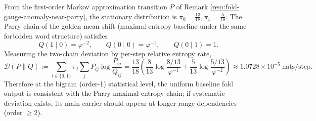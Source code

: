 \begin{remark}\label{rem:fold-gauge-anomaly-parry-kl}
From the first-order Markov approximation transition \(P\) of Remark \ref{rem:fold-gauge-anomaly-near-parry}, the stationary distribution is \(\pi_0=\frac{13}{18},\pi_1=\frac{5}{18}\).
The Parry chain of the golden mean shift (maximal entropy baseline under the same forbidden word structure) satisfies
\[
Q(1\mid 0)=\varphi^{-2},\qquad Q(0\mid 0)=\varphi^{-1},\qquad Q(0\mid 1)=1.
\]
Measuring the two-chain deviation by per-step relative entropy rate,
\[
\mathcal D(P\|Q):=\sum_{i\in\{0,1\}}\pi_i\sum_j P_{ij}\log\frac{P_{ij}}{Q_{ij}}
=\frac{13}{18}\!\left(\frac{8}{13}\log\frac{8/13}{\varphi^{-1}}+\frac{5}{13}\log\frac{5/13}{\varphi^{-2}}\right)
\approx 1.0728\times 10^{-5}\ \text{nats/step}.
\]
Therefore at the bigram (order-1) statistical level, the uniform baseline fold output is consistent with the Parry maximal entropy chain; if systematic deviation exists, its main carrier should appear at longer-range dependencies (order \(\ge 2\)).
\end{remark}
\fi












